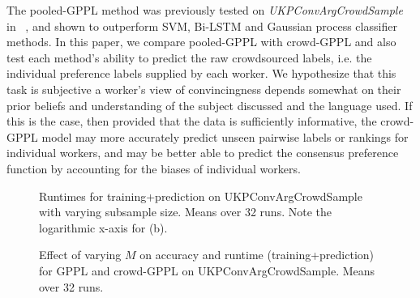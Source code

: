 The pooled-GPPL method was previously tested on \emph{UKPConvArgCrowdSample}
in ~\citep{simpson2018finding}, and shown to outperform SVM, Bi-LSTM and Gaussian process classifier
methods. 
In this paper, we compare pooled-GPPL with crowd-GPPL and also test each method's 
ability to predict the raw crowdsourced labels, i.e. the individual preference labels
supplied by each worker.
We hypothesize that this task is subjective a worker's view of convincingness 
depends somewhat on their prior beliefs and understanding of the subject 
discussed and the language used. 
If this is the case, then provided that the data is sufficiently informative,
the crowd-GPPL model may more accurately predict unseen 
pairwise labels or rankings for individual workers,
and may be better able to predict the consensus preference function by accounting 
for the biases of individual workers.


\begin{figure}
\subfloat[Varying no. ling+GloVe features. $M=500$]{
\label{fig:Nfeatures}
}
\caption{
    Runtimes for training+prediction on UKPConvArgCrowdSample with varying subsample size. Means over 32 runs. 
    Note the logarithmic x-axis for (b).
}
\end{figure}
\begin{figure}
\caption{
Effect of varying $M$ on accuracy and runtime (training+prediction) for GPPL and crowd-GPPL on UKPConvArgCrowdSample. Means over 32 runs.
}
\label{fig:M}
\end{figure}

